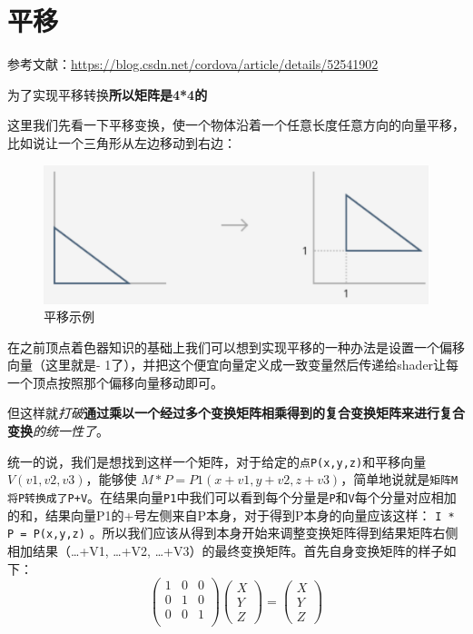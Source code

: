 \documentclass[UTF8,a4paper,12pt]{ctexbook}
\begin{document}
	\section{平移}
		参考文献：\url{https://blog.csdn.net/cordova/article/details/52541902}
		
		为了实现平移转换\textbf{所以矩阵是4*4的}
		
		
		这里我们先看一下平移变换，使一个物体沿着一个任意长度任意方向的向量平移，比如说让一个三角形从左边移动到右边：
			\begin{figure}[H]
				\centering
				\includegraphics[width=.7\linewidth]{transfer.png}
				\caption{平移示例}
			\end{figure}

		在之前顶点着色器知识的基础上我们可以想到实现平移的一种办法是设置一个偏移向量（这里就是- 1了），并把这个便宜向量定义成一致变量然后传递给shader让每一个顶点按照那个偏移向量移动即可。
		
		但这样就\textit{打破}\textbf{通过乘以一个经过多个变换矩阵相乘得到的复合变换矩阵来进行复合变换}\textit{的统一性了}。
		 
		统一的说，我们是想找到这样一个矩阵，对于给定的\verb|点P(x,y,z)|和平移向量$V(v1,v2,v3)$，能够使 $M * P = P1(x+v1, y+v2, z+v3) $，简单地说就是\verb|矩阵M将P转换成了P+V|。在结果向量\verb|P1|中我们可以看到每个分量是\verb|P|和\verb|V|每个分量对应相加的和，结果向量P1的+号左侧来自P本身，对于得到P本身的向量应该这样： 
		\verb|I * P = P(x,y,z)| 。所以我们应该从得到本身开始来调整变换矩阵得到结果矩阵右侧相加结果（…+V1, …+V2, …+V3）的最终变换矩阵。首先自身变换矩阵的样子如下：
			\begin{equation}
			 \left(
			\begin{array}{ccc}
			1 & 0 & 0\\
			
			0 & 1 & 0\\
			
			0 & 0 & 1\\
			\end{array}
			\right)
			\left(
			\begin{array}{c}
				X\\ 
				Y\\
				Z 
			\end{array}	
			\right) 
			=
			\left(
				\begin{array}{c}
				X\\ 
				Y\\
				Z 
				\end{array}	
			\right)
		\end{equation}
		
\end{document}
